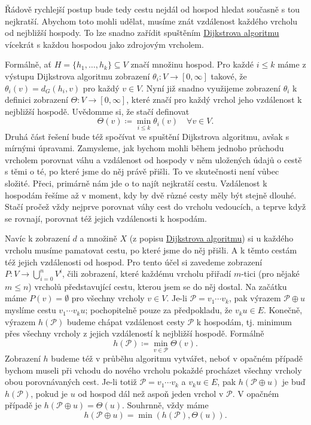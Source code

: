 Řádově rychlejší postup bude tedy cestu nejdál od hospod hledat současně s tou
nejkratší. Abychom toto mohli udělat, musíme znát vzdálenost každého vrcholu od
nejbližší hospody. To lze snadno zařídit spuštěním
\hyperref[alg:dijkstra]{Dijkstrova algoritmu} vícekrát s každou hospodou jako
zdrojovým vrcholem.

Formálně, ať $H = \{h_1,\ldots,h_k\} \subseteq V$ značí množinu hospod. Pro
každé $i \leq k$ máme z výstupu Dijkstrova algoritmu zobrazení $\theta_i:V \to
[0,\infty]$ takové, že $\theta_i(v) = d_G(h_i,v)$ pro každý $v \in V$. Nyní již
snadno využijeme zobrazení $\theta_i$ k definici zobrazení $\Theta:V \to
[0,\infty]$, které značí pro každý vrchol jeho vzdálenost k nejbližší hospodě.
Uvědomme si, že stačí definovat
\[
 \Theta(v) \coloneqq \min_{i \leq k} \theta_i(v) \quad \forall v \in V.
\]
Druhá část řešení bude též spočívat ve spuštění Dijkstrova algoritmu, a\-však s
mírnými úpravami. Zamysleme, jak bychom mohli během jednoho průchodu vrcholem
porovnat váhu a vzdálenost od hospody v něm uložených údajů o cestě s těmi o té,
po které jsme do něj právě přišli. To ve skutečnosti není vůbec složité. Přeci,
primárně nám jde o to najít nejkratší cestu. Vzdálenost k hospodám řešíme až v
moment, kdy by dvě různé cesty měly být stejně dlouhé. Stačí pročež vždy nejprve
porovnat váhy cest do vrcholu vedoucích, a teprve když se rovnají, porovnat též
jejich vzdálenosti k hospodám.

Navíc k zobrazení $d$ a množině $X$ (z popisu \hyperref[alg:dijkstra]{Dijkstrova
algoritmu}) si u každého vrcholu musíme pamatovat cestu, po které jsme do něj
přišli. A k těmto cestám též jejich vzdálenosti od hospod. Pro tento účel si
zavedeme zobrazení $P:V \to \bigcup_{i = 0}^{n} V^{i}$, čili zobrazení, které
každému vrcholu přiřadí $m$-tici (pro nějaké $m \leq n$) vrcholů představující
cestu, kterou jsem se do něj dostal. Na začátku máme $P(v) = \emptyset$ pro
všechny vrcholy $v \in V$. Je-li $\mathcal{P} = v_1\cdots v_k$, pak výrazem
$\mathcal{P} \oplus u$ myslíme cestu $v_1\cdots v_k u$; pochopitelně pouze za
předpokladu, že $v_ku \in E$. Konečně, výrazem $h(\mathcal{P})$ budeme chápat
vzdálenost cesty $\mathcal{P}$ k hospodám, tj. minimum přes všechny vrcholy z
jejich vzdáleností k nejbližší hospodě. Formálně
\[
 h(\mathcal{P}) \coloneqq \min_{v \in \mathcal{P}} \Theta(v).
\]
Zobrazení $h$ budeme též v průběhu algoritmu vytvářet, neboť v opačném případě
bychom museli při vchodu do nového vrcholu pokaždé procházet všechny vrcholy
obou porovnávaných cest. Je-li totiž $\mathcal{P} = v_1\cdots v_k$ a $v_ku \in
E$, pak $h(\mathcal{P} \oplus u)$ je buď $h(\mathcal{P})$, pokud je $u$ od
hospod dál než aspoň jeden vrchol v $\mathcal{P}$. V opačném případě je
$h(\mathcal{P} \oplus u) = \Theta(u)$. Souhrnně, vždy máme
\[
 h(\mathcal{P} \oplus u) = \min(h(\mathcal{P}),\Theta(u)).
\]

